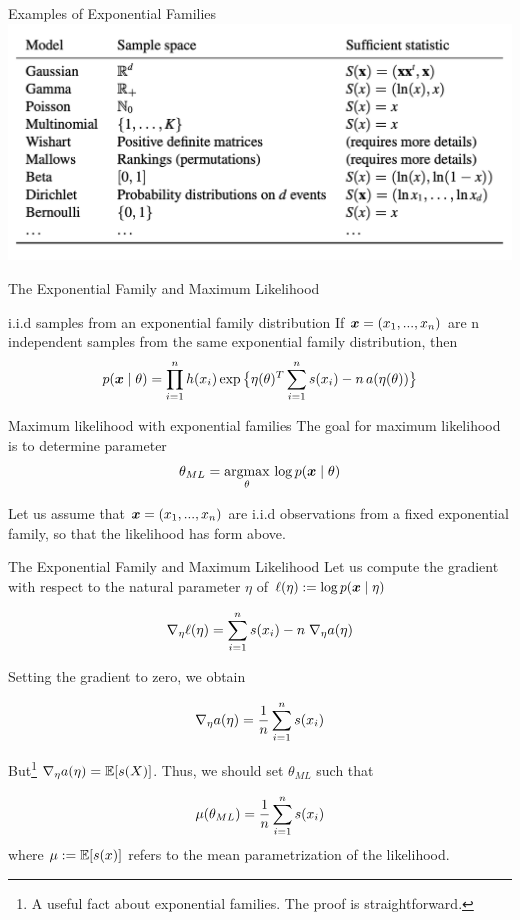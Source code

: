 \documentclass[10pt]{beamer}
\begin{document}
\begin{frame}{Examples of Exponential Families}
\includegraphics[width=\textwidth]{images/ef_examples}
\end{frame}



\begin{frame}{The Exponential Family and Maximum Likelihood}
\begin{sblock}{i.i.d samples from an exponential family distribution}
If ${\boldsymbol x}=(x_1, ..., x_n)$ are n independent samples from the same exponential family distribution, then 
\begin{align*}
 p({\boldsymbol x} \; | \; \theta) = \displaystyle\prod_{i=1}^n h(x_i) \exp \big\{ \eta(\theta)^T \sum_{i=1}^n s(x_i) - n \,a(\eta(\theta))\big\} 
 \end{align*}
 \end{sblock}
 
 \begin{sblock}{Maximum likelihood with exponential families}
 The goal for maximum likelihood is to determine parameter
\begin{equation*}
\theta_{ML} = \operatorname*{argmax}_\theta  \, \log p({\boldsymbol x} \; | \; \theta) 
\end{equation*}

Let us assume that ${\boldsymbol x}=(x_1, ..., x_n)$ are i.i.d observations  from a fixed exponential family, so that the likelihood has form above.
\end{sblock}
\end{frame}

\begin{frame}{The Exponential Family and Maximum Likelihood}
\footnotesize
 Let us compute the gradient with respect to the natural parameter $\eta$ of $\ell(\eta) := \log p({\boldsymbol x} \; | \; \eta)$

\[ \nabla_\eta \ell(\eta) = \displaystyle\sum_{i=1}^n s(x_i) - n \; \nabla_\eta a(\eta) \]

Setting the gradient to zero, we obtain

\[ \nabla_\eta a(\eta) = \displaystyle\frac{1}{n}  \displaystyle\sum_{i=1}^n s(x_i) \]

But\footnote{A useful fact about exponential families.  The proof is straightforward.}    $\nabla_\eta a(\eta) = \mathbb{E} [s(X)]$. Thus, we should set $\theta_{ML}$ such that

\[ \mu(\theta_{ML}) = \displaystyle\frac{1}{n} \displaystyle\sum_{i=1}^n s(x_i) \]
where $\mu := \mathbb{E}[s(x)]$ refers to the mean parametrization of the likelihood.
\end{frame}
\end{document}
